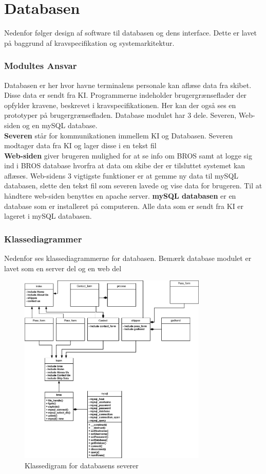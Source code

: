 \chapter{Databasen}
Nedenfor følger design af software til databasen og dens interface. Dette er lavet på baggrund af kravspecifikation og systemarkitektur. 



\subsection{Modultes Ansvar}
Databasen er her hvor havne terminalens personale kan aflæse data fra skibet. Disse data er sendt fra KI. Programmerne indeholder brugergrænseflader der opfylder kravene, beskrevet i kravspecifikationen. Her kan der også ses en prototyper på brugergrænsefladen.
Database modulet har 3 dele. Severen, Web-siden og en mySQL database. \\
\textbf{Severen} står for kommunikationen immellem KI og Databasen. Severen modtager data fra KI og lager disse i en tekst fil\\
\textbf{Web-siden} giver brugeren mulighed for at se info om BROS samt at logge sig ind i BROS database hvorfra at data om skibe der er tilsluttet systemet kan aflæses. Web-sidens 3 vigtigste funktioner er at gemme ny data til mySQL databasen, slette den tekst fil som severen lavede og vise data for brugeren. Til at håndtere web-siden benyttes en apache server.
\textbf{mySQL databasen} er en database som er  installeret på computeren. Alle data som er sendt fra KI er lageret i mySQL databasen.

\subsection{Klassediagrammer}
Nedenfor ses klassediagrammerne for databasen. Bemærk database modulet er lavet som en server del og en web del
\begin{figure}[H]
	\centering
	\includegraphics[width=0.8\textwidth]{billeder/web_klasse}
	\caption{Klassedigram for databasens severer}
	\label{fig:serverKlassediagram}
\end{figure}

